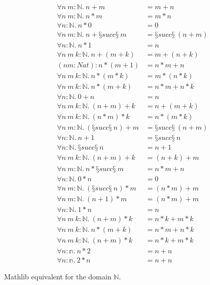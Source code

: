\begin{conjectureset}[H]
\begin{align}
\forall n\ m : \mathbb{N}.\ n + m &= m + n \\
\forall n\ m : \mathbb{N}.\ n * m &= m * n \\
\forall n : \mathbb{N}.\ n * 0 &= 0 \\
\forall n\ m : \mathbb{N}.\ n + §succ§\ m &= §succ§\ (n + m) \\
\forall n : \mathbb{N}.\ n * 1 &= n \\
\forall n\ m\ k : \mathbb{N}.\ n + (m + k) &= m + (n + k) \\
(n m : Nat) : n * (m + 1) &= n * m + n \\
\forall n\ m\ k : \mathbb{N}.\ n * (m * k) &= m * (n * k) \\
\forall n\ m\ k : \mathbb{N}.\ n * (m + k) &= n * m + n * k \\
\forall n : \mathbb{N}.\ 0 + n &= n \\
\forall n\ m\ k : \mathbb{N}.\ (n + m) + k &= n + (m + k) \\
\forall n\ m\ k : \mathbb{N}.\ (n * m) * k &= n * (m * k) \\
\forall n\ m : \mathbb{N}.\ (§succ§\ n) + m &= §succ§\ (n + m) \\
\forall n : \mathbb{N}.\ n + 1 &= §succ§\ n \\
\forall n : \mathbb{N}.\ §succ§\ n &= n + 1 \\
\forall n\ m\ k : \mathbb{N}.\ (n + m) + k &= (n + k) + m \\
\forall n\ m : \mathbb{N}.\ n * §succ§\ m &= n * m + n \\
\forall n : \mathbb{N}.\ 0 * n &= 0 \\
\forall n\ m : \mathbb{N}.\ (§succ§\ n) * m &= (n * m) + m \\
\forall n\ m : \mathbb{N}.\ (n + 1) * m &= (n * m) + m \\
\forall n : \mathbb{N}.\ 1 * n &= n \\
\forall n\ m\ k : \mathbb{N}.\ (n + m) * k &= n * k + m * k \\
\forall n\ m\ k : \mathbb{N}.\ n * (m + k) &= n * m + n * k \\
\forall n\ m\ k : \mathbb{N}.\ (n + m) * k &= n * k + m * k \\
\forall n : \mathbb{n}.\ n * 2 &= n + n \\
\forall n : \mathbb{n}.\ 2 * n &= n + n
\end{align}
\vspace{-0.9cm}
\caption{Mathlib equivalent for the domain $\mathbb{N}$.}\label{eqs:mathlib_recursive}
\end{conjectureset}
